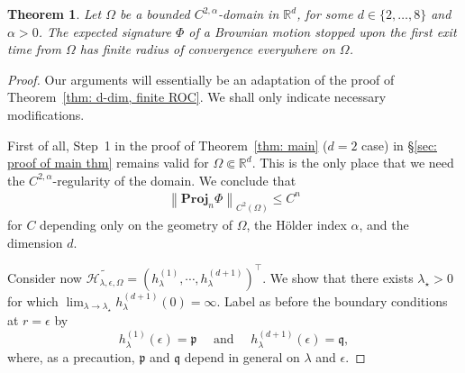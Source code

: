 \documentclass[11pt,a4paper,english,reqno]{amsart}
\theoremstyle{plain}
\newtheorem*{theorem*}{Theorem}
\newcommand{\R}{\mathbb{R}}
\newcommand{\e}{\epsilon}
\newcommand{\1}{\mathbbm{1}}
\newcommand{\proj}{\mathbf{Proj}}
\begin{document}
\begin{theorem*}
Let $\Omega$ be a bounded  $C^{2,\alpha}$-domain in $\R^d$, for some $d \in \{2, \ldots, 8\}$ and $\alpha > 0$. The expected signature $\Phi$ of a Brownian motion stopped upon the first exit time from $\Omega$ has finite radius of convergence everywhere on $\Omega$. 
\end{theorem*}
\begin{proof}
Our arguments will essentially be an adaptation of the proof of Theorem~\ref{thm: d-dim, finite ROC}. We shall only indicate necessary modifications.

First of all, Step~1 in the proof of Theorem~\ref{thm: main} ($d=2$ case) in \S\ref{sec: proof of main thm} remains valid for $\Omega \Subset \R^d$. This is the only place that we need the $C^{2,\alpha}$-regularity of the domain.  We conclude that  \begin{align*}
\left\|\proj_n \Phi\right\|_{C^2(\Omega)} \leq C^n
\end{align*}
for $C$ depending only on the geometry of $\Omega$, the H\"{o}lder index $\alpha$, and the dimension $d$. 

Consider now $\widetilde{\mathcal{H}_{\lambda, \e, \Omega}} = \left(h^{(1)}_{\lambda}, \cdots, h^{(d+1)}_{\lambda}\right)^{\top}$. We show that there  exists $\lambda_{\star} > 0$ for which $\lim_{\lambda \rightarrow \lambda_{\star} }h^{(d+1)}_{\lambda}(0) = \infty$. Label as before the boundary conditions at $r=\e$ by
\begin{equation}\label{bc, d dim general domain--new}
h^{(1)}_\lambda(\e) = \mathfrak{p} \quad \text{ and } \quad h^{(d+1)}_\lambda(\e)=\mathfrak{q},
\end{equation}
where, as a precaution, $\mathfrak{p}$ and $\mathfrak{q}$ depend in general on $\lambda$ and $\e$. 


\end{proof}
\end{document}
